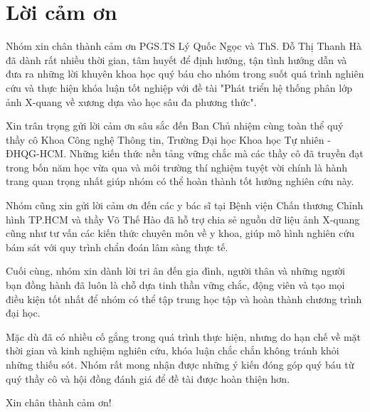 \chapter*{Lời cảm ơn}
\label{thanks}

Nhóm xin chân thành cảm ơn PGS.TS Lý Quốc Ngọc và ThS. Đỗ Thị Thanh Hà đã dành rất nhiều thời gian, tâm huyết để định hướng, tận tình hướng dẫn và đưa ra những lời khuyên khoa học quý báu cho nhóm trong suốt quá trình nghiên cứu và thực hiện khóa luận tốt nghiệp với đề tài "Phát triển hệ thống phân lớp ảnh X-quang về xương dựa vào học sâu đa phương thức". 

Xin trân trọng gửi lời cảm ơn sâu sắc đến Ban Chủ nhiệm cùng toàn thể quý thầy cô Khoa Công nghệ Thông tin, Trường Đại học Khoa học Tự nhiên - ĐHQG-HCM. Những kiến thức nền tảng vững chắc mà các thầy cô đã truyền đạt trong bốn năm học vừa qua và môi trường thí nghiệm tuyệt vời chính là hành trang quan trọng nhất giúp nhóm có thể hoàn thành tốt hướng nghiên cứu này.

Nhóm cũng xin gửi lời cảm ơn đến các y bác sĩ tại Bệnh viện Chấn thương Chỉnh hình TP.HCM và thầy Võ Thế Hào đã hỗ trợ chia sẻ nguồn dữ liệu ảnh X-quang cũng như tư vấn các kiến thức chuyên môn về y khoa, giúp mô hình nghiên cứu bám sát với quy trình chẩn đoán lâm sàng thực tế.

Cuối cùng, nhóm xin dành lời tri ân đến gia đình, người thân và những người bạn đồng hành đã luôn là chỗ dựa tinh thần vững chắc, động viên và tạo mọi điều kiện tốt nhất để nhóm có thể tập trung học tập và hoàn thành chương trình đại học.

Mặc dù đã có nhiều cố gắng trong quá trình thực hiện, nhưng do hạn chế về mặt thời gian và kinh nghiệm nghiên cứu, khóa luận chắc chắn không tránh khỏi những thiếu sót. Nhóm rất mong nhận được những ý kiến đóng góp quý báu từ quý thầy cô và hội đồng đánh giá để đề tài được hoàn thiện hơn.

Xin chân thành cảm ơn!